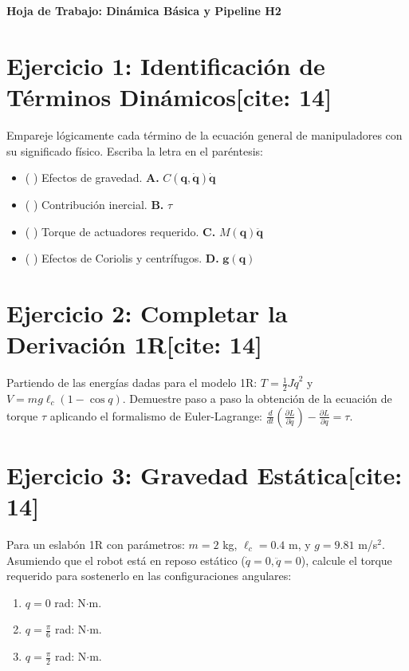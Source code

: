 \documentclass[11pt, a4paper]{article}
\begin{document}
\begin{center}
    \Large\textbf{\textcolor{ucbblue}{Hoja de Trabajo: Dinámica Básica y Pipeline H2}}\\[0.2cm]
\end{center}

\vspace{0.4cm}

\section*{Ejercicio 1: Identificación de Términos Dinámicos[cite: 14]}
Empareje lógicamente cada término de la ecuación general de manipuladores con su significado físico. Escriba la letra en el paréntesis:
\begin{itemize}
    \item[ ] ( \quad ) Efectos de gravedad. \hfill \textbf{A.} $C(\mathbf{q}, \dot{\mathbf{q}})\dot{\mathbf{q}}$
    \item[ ] ( \quad ) Contribución inercial. \hfill \textbf{B.} $\tau$
    \item[ ] ( \quad ) Torque de actuadores requerido. \hfill \textbf{C.} $M(\mathbf{q})\ddot{\mathbf{q}}$
    \item[ ] ( \quad ) Efectos de Coriolis y centrífugos. \hfill \textbf{D.} $\mathbf{g}(\mathbf{q})$
\end{itemize}

\section*{Ejercicio 2: Completar la Derivación 1R[cite: 14]}
Partiendo de las energías dadas para el modelo 1R: $T = \frac{1}{2}J\dot{q}^2$ y $V = mg\ell_c(1-\cos q)$.
Demuestre paso a paso la obtención de la ecuación de torque $\tau$ aplicando el formalismo de Euler-Lagrange: $\frac{d}{dt}\left(\frac{\partial L}{\partial \dot{q}}\right) - \frac{\partial L}{\partial q} = \tau$.
\vspace{4.5cm}

\section*{Ejercicio 3: Gravedad Estática[cite: 14]}
Para un eslabón 1R con parámetros: $m = 2$ kg, $\ell_c = 0.4$ m, y $g = 9.81$ m/s$^2$. \\
Asumiendo que el robot está en reposo estático ($\dot{q} = 0, \ddot{q} = 0$), calcule el torque requerido para sostenerlo en las configuraciones angulares:
\begin{enumerate}
    \item $q = 0$ rad: \underline{\hspace{4cm}} N$\cdot$m.
    \item $q = \frac{\pi}{6}$ rad: \underline{\hspace{4cm}} N$\cdot$m.
    \item $q = \frac{\pi}{2}$ rad: \underline{\hspace{4cm}} N$\cdot$m.
\end{enumerate}
\end{document}
